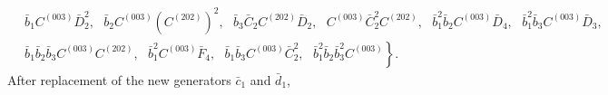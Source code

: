 \documentclass[10pt]{amsart}
\theoremstyle{definition}
\theoremstyle{corollary}
\theoremstyle{remark}
\theoremstyle{conclusion}
\begin{document}
\begin{align*}
    &\, \bar{b}_1 C^{(003)} \bar{D}_2^2, \text{ }\bar{b}_2 C^{(003)} \left(C^{(202)}\right)^2, \text{ }\bar{b}_3 \bar{C}_2 C^{(202)} \bar{D}_2, \text{ }C^{(003)} \bar{C}_2^2 C^{(202)}, \text{ }\bar{b}_1^2 \bar{b}_2 C^{(003)} \bar{D}_4, \text{ }\bar{b}_1^2 \bar{b}_3 C^{(003)} \bar{D}_3, \\
    & \,\left.\bar{b}_1 \bar{b}_2 \bar{b}_3 C^{(003)} C^{(202)}, \text{ }\bar{b}_1^2 C^{(003)} \bar{F}_4, \text{ }\bar{b}_1 \bar{b}_3 C^{(003)} \bar{C}_2^2, \text{ }\bar{b}_1^2 \bar{b}_2 \bar{b}_3^2 C^{(003)}\right\} .
\end{align*} After replacement of the new generators $\bar{c}_1$ and $\bar{d}_1$, %
\end{document}
